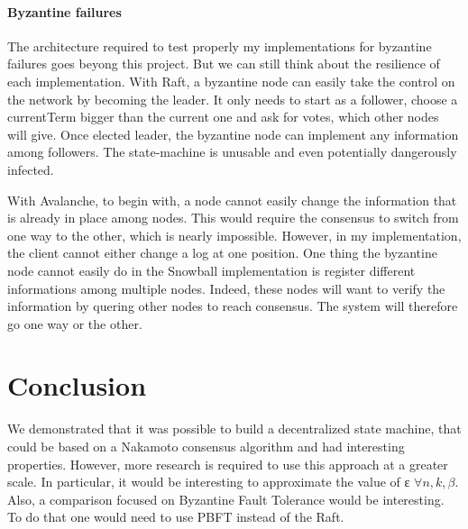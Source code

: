 \documentclass[11pt, twocolumn]{article}
\begin{document}
\paragraph{Byzantine failures}
The architecture required to test properly my implementations for byzantine failures goes beyong this project. But we can still think about the resilience of each implementation.
With Raft, a byzantine node can easily take the control on the network by becoming the leader. It only needs to start as a follower, choose a currentTerm bigger than the current one and ask for votes, which other nodes will give.
Once elected leader, the byzantine node can implement any information among followers. The state-machine is unusable and even potentially dangerously infected.

With Avalanche, to begin with, a node cannot easily change the information that is already in place among nodes. This would require the consensus to switch from one way to the other, which is nearly impossible. However, in my implementation, the client cannot either change a log at one position.
One thing the byzantine node cannot easily do in the Snowball implementation is register different informations among multiple nodes. Indeed, these nodes will want to verify the information by quering other nodes to reach consensus. The system will therefore go one way or the other.

\section{Conclusion}

We demonstrated that it was possible to build a decentralized state machine, that could be based on a Nakamoto consensus algorithm and had interesting properties.
However, more research is required to use this approach at a greater scale.
In particular, it would be interesting to approximate the value of ε $\forall n, k, \beta$. 
Also, a comparison focused on Byzantine Fault Tolerance would be interesting. To do that one would need to use PBFT \cite{pbft} instead of the Raft.

\onecolumn
\end{document}
